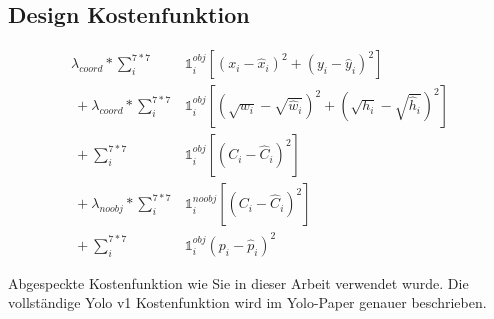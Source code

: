 \subsection{Design Kostenfunktion}
\label{chapter:design_kostenfunktion}

\begin{eqfloat}
\begin{equation}
\begin{split}
	\lambda_{coord} * \sum_{i}^{7*7}& \mathds{1}_{i}^{obj}[(x_{i}-\hat{x}_i)^{2} + (y_{i}-\hat{y}_i)^{2}] \\\
	+ \lambda_{coord} * \sum_{i}^{7*7}& \mathds{1}_{i}^{obj}[(\sqrt{w_{i}}-\sqrt{\hat{w}_{i}})^{2}+(\sqrt{h_{i}}-\sqrt{\hat{h}_{i}})^{2}] \\\
	+ \sum_{i}^{7*7}& \mathds{1}_{i}^{obj}[(C_{i} - \hat{C}_{i})^{2}] \\\
	+ \lambda_{noobj} * \sum_{i}^{7*7}& \mathds{1}_{i}^{noobj} [(C_{i} - \hat{C}_{i})^{2}] \\\
	+ \sum_{i}^{7*7}&\mathds{1}_{i}^{obj} (p_{i}-\hat{p}_{i})^{2}
\end{split} 
\end{equation}
\caption{Abgespeckte Kostenfunktion wie Sie in dieser Arbeit verwendet wurde. Die vollständige Yolo v1 Kostenfunktion wird im Yolo-Paper\cite{yolo} genauer beschrieben.}
\label{eq:Kostenfunktion}
\end{eqfloat}


